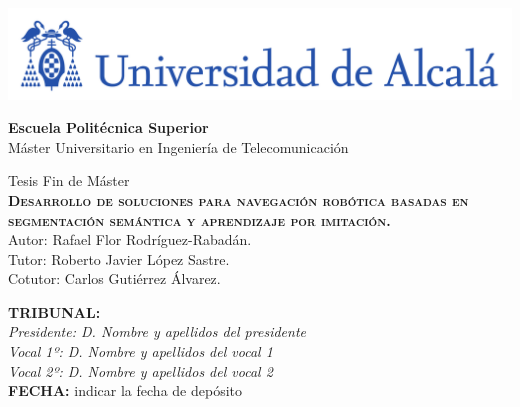 

\begin{center}

\includegraphics[width=15cm]{figuras/logo-uah.pdf}\\
\vspace{0.5cm}


\LARGE  \textbf{Escuela Politécnica Superior}\\


Máster Universitario en Ingeniería de Telecomunicación\\
\end{center}

\vspace{0.5cm}



\begin{center}
\vspace{0.5cm}

\LARGE Tesis Fin de Máster\\

\textbf{\Huge \textsc{{Desarrollo de soluciones para navegación robótica basadas en segmentación semántica y aprendizaje por imitación.}}}\\
\vspace{0.5cm}
\large Autor: Rafael Flor Rodríguez-Rabadán.\\
Tutor: Roberto Javier López Sastre.\\
Cotutor: Carlos Gutiérrez Álvarez.\\
\vspace{0.5cm}
\end{center}

\begin{flushleft}
\textbf{TRIBUNAL:}\\
\vspace{1cm}
\textit{Presidente: D. Nombre y apellidos del presidente}\\
\vspace{1cm}
\textit{Vocal 1º: D. Nombre y apellidos del vocal 1}\\
\vspace{1cm}
\textit{Vocal 2º: D. Nombre y apellidos del vocal 2}\\
\vspace{1cm}
\textbf{FECHA:} indicar la fecha de depósito\\ 

\end{flushleft}

\newpage
\thispagestyle{empty}
\hspace*{0.5cm}
\newpage


